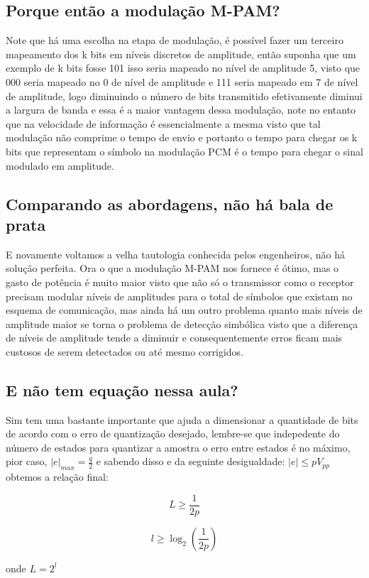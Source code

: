 \subsection{Porque então a modulação M-PAM?}

Note que há uma escolha na etapa de modulação, é possível fazer um terceiro mapeamento dos k bits em níveis discretos de amplitude, então suponha que um exemplo de k bits
fosse 101 isso seria mapeado no nível de amplitude 5, visto que 000 seria mapeado no 0 de nível de amplitude e 111 seria mapeado em 7 de nível de amplitude, logo diminuindo
o número de bits transmitido efetivamente diminui a largura de banda e essa é a maior vantagem dessa modulação, note no entanto que na velocidade de informação é essencialmente
a mesma visto que tal modulação não comprime o tempo de envio e portanto o tempo para chegar os k bits que representam o símbolo na modulação PCM é o tempo para chegar o sinal
modulado em amplitude.

\subsection{Comparando as abordagens, não há bala de prata }

E novamente voltamos a velha tautologia conhecida pelos engenheiros, não há solução perfeita. Ora o que a modulação M-PAM nos fornece é ótimo, mas o gasto de potência é muito maior
visto que não só o transmissor como o receptor precisam modular níveis de amplitudes para o total de símbolos que existam no esquema de comunicação, mas ainda há um outro problema
quanto mais níveis de amplitude maior se torna o problema de detecção simbólica visto que a diferença de níveis de amplitude tende a diminuir e consequentemente erros ficam mais custosos de serem detectados ou até mesmo corrigidos.

\subsection{E não tem equação nessa aula?}

Sim tem uma bastante importante que ajuda a dimensionar a quantidade de bits de acordo com o erro de quantização desejado, lembre-se que indepedente do número de estados para
quantizar a amostra o erro entre estados é no máximo, pior caso, $|e|_{max}=\frac{q}{2}$ e sabendo disso e da seguinte desigualdade: $|e| \le pV_{pp}$ obtemos a relação final:

\begin{equation}
	L \ge \frac{1}{2p}
\end{equation}

\begin{equation}
	l \ge \log_{2}(\frac{1}{2p})
\end{equation}

onde $L=2^{l}$

